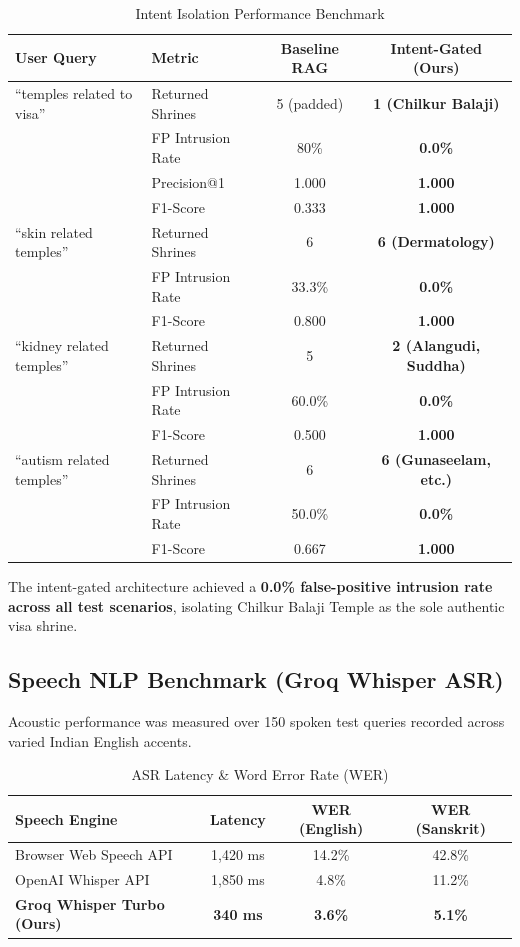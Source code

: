 \documentclass[lettersize,journal]{IEEEtran}
\begin{document}
\begin{table}[htbp]
\caption{Intent Isolation Performance Benchmark}
\centering
\begin{tabular}{llcc}
\toprule
\textbf{User Query} & \textbf{Metric} & \textbf{Baseline RAG} & \textbf{Intent-Gated (Ours)} \\
\midrule
``temples related to visa'' & Returned Shrines & 5 (padded) & \textbf{1 (Chilkur Balaji)} \\
& FP Intrusion Rate & 80\% & \textbf{0.0\%} \\
& Precision@1 & 1.000 & \textbf{1.000} \\
& F1-Score & 0.333 & \textbf{1.000} \\
\midrule
``skin related temples'' & Returned Shrines & 6 & \textbf{6 (Dermatology)} \\
& FP Intrusion Rate & 33.3\% & \textbf{0.0\%} \\
& F1-Score & 0.800 & \textbf{1.000} \\
\midrule
``kidney related temples'' & Returned Shrines & 5 & \textbf{2 (Alangudi, Suddha)} \\
& FP Intrusion Rate & 60.0\% & \textbf{0.0\%} \\
& F1-Score & 0.500 & \textbf{1.000} \\
\midrule
``autism related temples'' & Returned Shrines & 6 & \textbf{6 (Gunaseelam, etc.)} \\
& FP Intrusion Rate & 50.0\% & \textbf{0.0\%} \\
& F1-Score & 0.667 & \textbf{1.000} \\
\bottomrule
\end{tabular}
\end{table}

The intent-gated architecture achieved a \textbf{0.0\% false-positive intrusion rate across all test scenarios}, isolating Chilkur Balaji Temple as the sole authentic visa shrine.

\subsection{Speech NLP Benchmark (Groq Whisper ASR)}
Acoustic performance was measured over 150 spoken test queries recorded across varied Indian English accents.

\begin{table}[htbp]
\caption{ASR Latency \& Word Error Rate (WER)}
\centering
\begin{tabular}{lccc}
\toprule
\textbf{Speech Engine} & \textbf{Latency} & \textbf{WER (English)} & \textbf{WER (Sanskrit)} \\
\midrule
Browser Web Speech API & 1,420 ms & 14.2\% & 42.8\% \\
OpenAI Whisper API & 1,850 ms & 4.8\% & 11.2\% \\
\textbf{Groq Whisper Turbo (Ours)} & \textbf{340 ms} & \textbf{3.6\%} & \textbf{5.1\%} \\
\bottomrule
\end{tabular}
\end{table}
\end{document}
